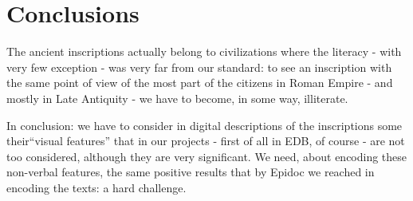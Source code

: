 \documentclass[amsthm,ebook]{saparticle}
\begin{document}
\section{Conclusions}


\noindent The ancient inscriptions actually belong to civilizations where the literacy - with very few exception - was very far
from our standard: to see an inscription with the same point of view of the most part of the citizens in Roman Empire -
and mostly in Late Antiquity - we have to become, in some way, illiterate. 

In conclusion: we have to consider in digital descriptions of the inscriptions some their``visual
features'' that in our projects - first of all in EDB, of course - are not too considered, although they
are very significant. We need, about encoding these non-verbal features, the same positive results that by Epidoc we
reached in encoding the texts: a hard challenge.



\end{document}
